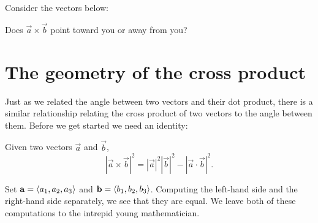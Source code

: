\documentclass{ximera}
\begin{document}
\begin{question}
  Consider the vectors below:
  \begin{image}
  \end{image}
  Does $\vec{a}\times\vec{b}$ point toward you or away from you?
  \begin{prompt}
    \begin{multipleChoice}
    \end{multipleChoice}
  \end{prompt}
\end{question}



\section{The geometry of the cross product}

Just as we related the angle between two vectors and their dot
product, there is a similar relationship relating the cross product of
two vectors to the angle between them. Before we get started we need
an identity:

\begin{theorem}
  Given two vectors $\vec{a}$ and $\vec{b}$,
  \[
  |\vec{a}\times\vec{b}|^2 = |\vec{a}|^2 |\vec{b}|^2 - |\vec{a}\cdot\vec{b}|^2.
  \]
  \begin{explanation}
    Set $\mathbf{a}=\left\langle a_1,a_2,a_3\right\rangle$ and
    $\mathbf{b}=\left\langle b_1,b_2,b_3\right\rangle$. Computing the left-hand side and
    the right-hand side separately, we see that they are equal. We
    leave both of these computations to the intrepid young
    mathematician.
  \end{explanation}
\end{theorem}
\end{document}
